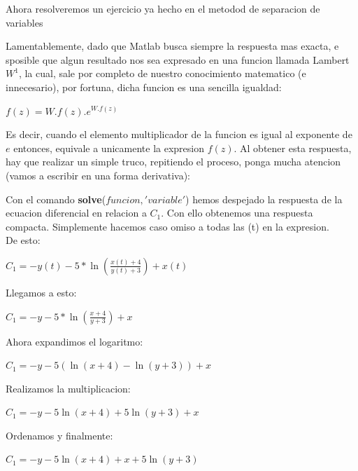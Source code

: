 \documentclass[10pt,a4paper]{article}
\begin{document}
Ahora resolveremos un ejercicio ya hecho en el metodod de separacion de variables














Lamentablemente, dado que Matlab busca siempre la respuesta mas exacta, e sposible que algun resultado nos sea expresado en una funcion llamada Lambert $W^1$, la cual, sale por completo de nuestro conocimiento matematico (e innecesario), por fortuna, dicha funcion es una sencilla igualdad:

\begin{center}
$f(z)=W.f(z).e^{W.f(z)}$
\end{center}

Es decir, cuando el elemento multiplicador de la funcion es igual al exponente de $e$ entonces, equivale a unicamente la expresion $f(z)$. Al obtener esta respuesta, hay que realizar un simple truco, repitiendo el proceso, ponga mucha atencion (vamos a escribir en una forma derivativa):










Con el comando {\bf solve}($funcion,'variable'$) hemos despejado la respuesta de la ecuacion diferencial en relacion a $C_1$. Con ello obtenemos una respuesta compacta. Simplemente hacemos caso omiso a todas las (t) en la expresion.
\\
De esto:
\begin{center}
$C_1=-y(t)-5*\ln (\frac{x(t)+4}{y(t)+3})+x(t)$
\end{center}

Llegamos a esto:
\begin{center}
$C_1=-y-5*\ln (\frac{x+4}{y+3})+x$
\end{center}

Ahora expandimos el logaritmo:
\begin{center}
$C_1=-y-5(\ln(x+4)-\ln(y+3))+x$
\end{center}

Realizamos la multiplicacion:
\begin{center}
$C_1=-y-5\ln(x+4)+5\ln(y+3)+x$
\end{center}
  
Ordenamos y finalmente:
\begin{center}
$C_1=-y-5\ln(x+4)+x+5\ln(y+3)$
\end{center}
 
\end{document}
